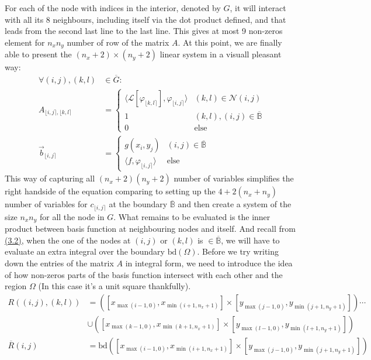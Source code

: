 \documentclass[]{article}
\begin{document}
    For each of the node with indices in the interior, denoted by $G$, it will interact with all its 8 neighbours, including itself via the dot product defined, and that leads from the second last line to the last line. This gives at most 9 non-zeros element for $n_xn_y$ number of row of the matrix $A$. At this point, we are finally able to present the $(n_x + 2)\times(n_y + 2)$ linear system in a visuall pleasant way: 
    \begin{align*}\tag{3.8}\label{eqn:3.8}
        \forall  (i,j), (k, l) &\in \overline{G}: 
        \\
        A_{\lfloor i,j \rceil, \lfloor k, l \rceil}
        &= 
        \begin{cases}
            \langle \mathcal{L}[\varphi_{\lfloor k, l \rceil}], \varphi_{\lfloor i,j \rceil}\rangle & (k, l) \in \mathcal{N}(i, j)
            \\
            1 & (k, l), (i, j) \in \overline{\mathbb{B}}
            \\
            0 & \text{else}
        \end{cases}
        \\
        \vec{b}_{\lfloor i,j \rceil} &= 
        \begin{cases}
            g(x_i, y_j) & (i, j)\in \overline{\mathbb{B}}
            \\
            \langle f,\varphi_{\lfloor i,j \rceil} \rangle & \text{else}
        \end{cases}
    \end{align*}
    This way of capturing all $(n_x + 2)(n_y + 2)$ number of variables simplifies the right handside of the equation comparing to setting up the $4 + 2(n_x + n_y)$ number of variables for $c_{\lfloor i, j\rceil}$ at the boundary $\overline{\mathbb{B}}$ and then create a system of the size $n_xn_y$ for all the node in $G$. What remains to be evaluated is the inner product between basis function at neighbouring nodes and itself. And recall from \hyperref[eqn:3.2]{(3.2)}, when the one of the nodes at $(i,j)$ or $(k, l)$ is $\in \overline{\mathbb{B}}$, we will have to evaluate an extra integral over the boundary $\text{bd}(\Omega)$. Before we try writing down the entries of the matrix $A$ in integral form, we need to introduce the idea of how non-zeros parts of the basis function intersect with each other and the region $\Omega$ (In this case it's a unit square thankfully). 
    \begin{align*}\tag{3.9}\label{eqn:3.9}
        R((i, j), (k, l)) &= 
        ([x_{\max(i - 1, 0)}, x_{\min(i + 1, n_x + 1)}]\times 
        [y_{\max(j - 1, 0)}, y_{\min(j + 1, n_y + 1)}]) \cdots
        \\
        &\cup 
        (
            [x_{\max(k - 1, 0)}, x_{\min(k + 1, n_x + 1)}]\times
            [y_{\max(l - 1, 0)}, y_{\min(l + 1, n_y + 1)}]
        )
        \\
        \overline{R}(i, j) &= \text{bd}([x_{\max(i - 1, 0)}, x_{\min(i + 1, n_x + 1)}]\times 
        [y_{\max(j - 1, 0)}, y_{\min(j + 1, n_y + 1)}])
    \end{align*}
\end{document}
